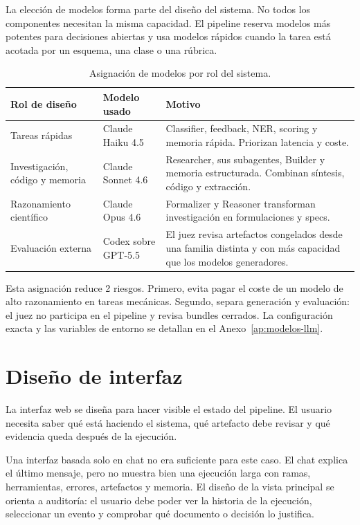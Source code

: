 La elección de modelos forma parte del diseño del sistema. No todos los
componentes necesitan la misma capacidad. El pipeline reserva modelos más
potentes para decisiones abiertas y usa modelos rápidos cuando la tarea está
acotada por un esquema, una clase o una rúbrica.

\begin{table}[H]
\begin{center}
\small
\begin{tabular}{|p{3.1cm}|p{3.7cm}|p{5.4cm}|} \hline
\textbf{Rol de diseño} & \textbf{Modelo usado} & \textbf{Motivo} \\ \hline
Tareas rápidas & Claude Haiku 4.5 & Classifier, feedback, NER, scoring y memoria rápida. Priorizan latencia y coste. \\ \hline
Investigación, código y memoria & Claude Sonnet 4.6 & Researcher, sus subagentes, Builder y memoria estructurada. Combinan síntesis, código y extracción. \\ \hline
Razonamiento científico & Claude Opus 4.6 & Formalizer y Reasoner transforman investigación en formulaciones y specs. \\ \hline
Evaluación externa & Codex sobre GPT-5.5 & El juez revisa artefactos congelados desde una familia distinta y con más capacidad que los modelos generadores. \\ \hline
\end{tabular}
\caption{Asignación de modelos por rol del sistema.}
\label{tab:modelos-por-rol}
\end{center}
\end{table}

Esta asignación reduce 2 riesgos. Primero, evita pagar el coste de un modelo
de alto razonamiento en tareas mecánicas. Segundo, separa generación y
evaluación: el juez no participa en el pipeline y revisa bundles cerrados. La
configuración exacta y las variables de entorno se detallan en el
Anexo~\ref{ap:modelos-llm}.

\section{Diseño de interfaz}

La interfaz web se diseña para hacer visible el estado del pipeline. El usuario
necesita saber qué está haciendo el sistema, qué artefacto debe revisar y qué
evidencia queda después de la ejecución.

Una interfaz basada solo en chat no era suficiente para este caso. El chat
explica el último mensaje, pero no muestra bien una ejecución larga con ramas,
herramientas, errores, artefactos y memoria. El diseño de la vista principal se
orienta a auditoría: el usuario debe poder ver la historia de la ejecución,
seleccionar un evento y comprobar qué documento o decisión lo justifica.


